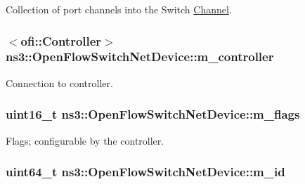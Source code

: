 Collection of port channels into the Switch \hyperlink{classns3_1_1Channel}{Channel}. 

\subsubsection[{\texorpdfstring{m\+\_\+controller}{m_controller}}]{$<${\bf ofi\+::\+Controller}$>$ ns3\+::\+Open\+Flow\+Switch\+Net\+Device\+::m\+\_\+controller\hspace{0.3cm}{\ttfamily [private]}}\hypertarget{classns3_1_1OpenFlowSwitchNetDevice_adbded8b966a707ca33bb225b33809e49}{}\label{classns3_1_1OpenFlowSwitchNetDevice_adbded8b966a707ca33bb225b33809e49}


Connection to controller. 

\subsubsection[{\texorpdfstring{m\+\_\+flags}{m_flags}}]{\setlength{\rightskip}{0pt plus 5cm}uint16\+\_\+t ns3\+::\+Open\+Flow\+Switch\+Net\+Device\+::m\+\_\+flags\hspace{0.3cm}{\ttfamily [private]}}\hypertarget{classns3_1_1OpenFlowSwitchNetDevice_a5bce0e985237e957abf794d3dd6416be}{}\label{classns3_1_1OpenFlowSwitchNetDevice_a5bce0e985237e957abf794d3dd6416be}


Flags; configurable by the controller. 

\subsubsection[{\texorpdfstring{m\+\_\+id}{m_id}}]{\setlength{\rightskip}{0pt plus 5cm}uint64\+\_\+t ns3\+::\+Open\+Flow\+Switch\+Net\+Device\+::m\+\_\+id\hspace{0.3cm}{\ttfamily [private]}}\hypertarget{classns3_1_1OpenFlowSwitchNetDevice_a0af690c63ccd5d84b4abd671213086b2}{}\label{classns3_1_1OpenFlowSwitchNetDevice_a0af690c63ccd5d84b4abd671213086b2}


